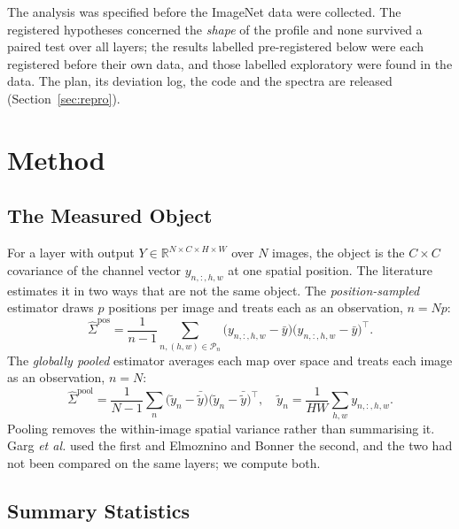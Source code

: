 \documentclass[10pt,journal,compsoc]{IEEEtran}
\begin{document}
The analysis was specified before the ImageNet data were collected. The
registered hypotheses concerned the \emph{shape} of the profile and none
survived a paired test over all layers; the results labelled
pre-registered below were each registered before their own data, and those
labelled exploratory were found in the data. The plan, its deviation log,
the code and the spectra are released (Section~\ref{sec:repro}).

\section{Method}
\label{sec:method}

\subsection{The Measured Object}
\label{sec:object}

For a layer with output $Y \in \mathbb{R}^{N \times C \times H \times W}$
over $N$ images, the object is the $C \times C$ covariance of the channel
vector $y_{n,:,h,w}$ at one spatial position. The literature estimates it in
two ways that are not the same object. The \emph{position-sampled}
estimator draws $p$ positions per image and treats each as an observation,
$n = Np$:
\begin{equation}
  \hat{\Sigma}^{\text{pos}}
  = \frac{1}{n-1}\sum_{n,(h,w) \in \mathcal{P}_n}
    \bigl(y_{n,:,h,w}-\bar{y}\bigr)\bigl(y_{n,:,h,w}-\bar{y}\bigr)^{\!\top}.
  \label{eq:covpos}
\end{equation}
The \emph{globally pooled} estimator averages each map over space and treats
each image as an observation, $n = N$:
\begin{equation}
  \hat{\Sigma}^{\text{pool}}
  = \frac{1}{N-1}\sum_{n}
    \bigl(\tilde{y}_n-\bar{\tilde{y}}\bigr)
    \bigl(\tilde{y}_n-\bar{\tilde{y}}\bigr)^{\!\top},
  \quad
  \tilde{y}_n = \frac{1}{HW}\sum_{h,w} y_{n,:,h,w}.
  \label{eq:covpool}
\end{equation}
Pooling removes the within-image spatial variance rather than summarising
it. Garg \emph{et al.} \cite{garg2019lowEffort} used the first and
Elmoznino and Bonner \cite{elmoznino2024highDim} the second, and the two
had not been compared on the same layers; we compute both.

\subsection{Summary Statistics}
\label{sec:stats}
\end{document}
